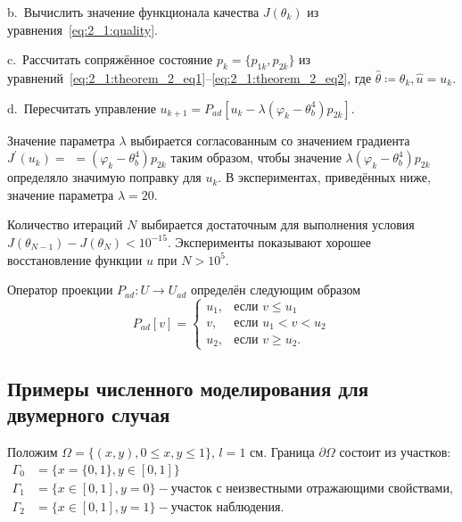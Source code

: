 \hspace{1cm} b.\ Вычислить значение функционала качества
$J(\theta_k)$ из уравнения~\eqref{eq:2_1:quality}.

\hspace{1cm} c.\ Рассчитать сопряжённое состояние $p_k=\{p_{1k},p_{2k}\}$ из
уравнений~\eqref{eq:2_1:theorem_2_eq1}--\eqref{eq:2_1:theorem_2_eq2},
где $ \hat{\theta} \coloneqq \theta_k, \hat{u}=u_k$.

\hspace{1cm} d.\  Пересчитать управление
$u_{k+1} = P_{ad}\left[ u_k - \lambda (\varphi_k - \theta_b^4)p_{2k} \right]$.


Значение параметра $\lambda$ выбирается согласованным со значением
градиента $J^{\prime}\left(u_{k}\right)=$ $=\left(\varphi_{k}-\theta_{b}^{4}\right) p_{2k}$
таким образом, чтобы значение $\lambda\left(\varphi_{k}-\theta_{b}^{4}\right) p_{2k}$
определяло значимую поправку для $u_{k}$.
В экспериментах, приведённых ниже, значение параметра $\lambda=20$.

Количество итераций $N$ выбирается достаточным для выполнения условия
$J\left(\theta_{N-1}\right)-J\left(\theta_{N}\right)<10^{-15}$.
Эксперименты показывают хорошее восстановление функции $u$ при $N>10^{5}$.

Оператор проекции $P_{ad} : U \to U_{ad}$ определён следующим образом
\[
    P_{ad}[v] =
    \begin{cases}
        u_1, & \text{если } v \le u_1 \\
        v, & \text{если } u_1 < v < u_2 \\
        u_2, & \text{если } v \ge u_2.
    \end{cases}
\]


\subsection{Примеры численного моделирования для двумерного случая}
\label{subsec:ch4/sec3/numeric-samples}

Положим $\Omega = \{(x,y), 0 \leq x,y \leq 1\}$, $l = 1$ см.
Граница $\partial\Omega$ состоит из участков:
\[
    \begin{aligned}
        \Gamma_0 & = \{x=\{0,1\}, y \in [0,1]\} \\
        \Gamma_1 & = \{x\in [0,1], y=0\}
        - \text{участок с неизвестными отражающими свойствами}, \\
        \Gamma_2 & = \{x \in [0,1], y=1\} - \text{участок наблюдения}.
    \end{aligned}
\]

